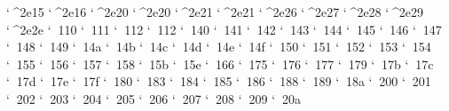 \XeTeXcharclass `^^^^2e15 \symbols
\XeTeXcharclass `^^^^2e16 \symbols
\XeTeXcharclass `^^^^2e20 \symbols
\XeTeXcharclass `^^^^2e20 \symbols
\XeTeXcharclass `^^^^2e21 \symbols
\XeTeXcharclass `^^^^2e21 \symbols
\XeTeXcharclass `^^^^2e26 \symbols
\XeTeXcharclass `^^^^2e27 \symbols
\XeTeXcharclass `^^^^2e28 \symbols
\XeTeXcharclass `^^^^2e29 \symbols
\XeTeXcharclass `^^^^2e2e \symbols
\XeTeXcharclass `^^^^^10110 \symbols
\XeTeXcharclass `^^^^^10111 \symbols
\XeTeXcharclass `^^^^^10112 \symbols
\XeTeXcharclass `^^^^^10112 \symbols
\XeTeXcharclass `^^^^^10140 \symbols
\XeTeXcharclass `^^^^^10141 \symbols
\XeTeXcharclass `^^^^^10142 \symbols
\XeTeXcharclass `^^^^^10143 \symbols
\XeTeXcharclass `^^^^^10144 \symbols
\XeTeXcharclass `^^^^^10145 \symbols
\XeTeXcharclass `^^^^^10146 \symbols
\XeTeXcharclass `^^^^^10147 \symbols
\XeTeXcharclass `^^^^^10148 \symbols
\XeTeXcharclass `^^^^^10149 \symbols
\XeTeXcharclass `^^^^^1014a \symbols
\XeTeXcharclass `^^^^^1014b \symbols
\XeTeXcharclass `^^^^^1014c \symbols
\XeTeXcharclass `^^^^^1014d \symbols
\XeTeXcharclass `^^^^^1014e \symbols
\XeTeXcharclass `^^^^^1014f \symbols
\XeTeXcharclass `^^^^^10150 \symbols
\XeTeXcharclass `^^^^^10151 \symbols
\XeTeXcharclass `^^^^^10152 \symbols
\XeTeXcharclass `^^^^^10153 \symbols
\XeTeXcharclass `^^^^^10154 \symbols
\XeTeXcharclass `^^^^^10155 \symbols
\XeTeXcharclass `^^^^^10156 \symbols
\XeTeXcharclass `^^^^^10157 \symbols
\XeTeXcharclass `^^^^^10158 \symbols
\XeTeXcharclass `^^^^^1015b \symbols
\XeTeXcharclass `^^^^^1015e \symbols
\XeTeXcharclass `^^^^^10166 \symbols
\XeTeXcharclass `^^^^^10175 \symbols
\XeTeXcharclass `^^^^^10176 \symbols
\XeTeXcharclass `^^^^^10177 \symbols
\XeTeXcharclass `^^^^^10179 \symbols
\XeTeXcharclass `^^^^^1017b \symbols
\XeTeXcharclass `^^^^^1017c \symbols
\XeTeXcharclass `^^^^^1017d \symbols
\XeTeXcharclass `^^^^^1017e \symbols
\XeTeXcharclass `^^^^^1017f \symbols
\XeTeXcharclass `^^^^^10180 \symbols
\XeTeXcharclass `^^^^^10183 \symbols
\XeTeXcharclass `^^^^^10184 \symbols
\XeTeXcharclass `^^^^^10185 \symbols
\XeTeXcharclass `^^^^^10186 \symbols
\XeTeXcharclass `^^^^^10188 \symbols
\XeTeXcharclass `^^^^^10189 \symbols
\XeTeXcharclass `^^^^^1018a \symbols
\XeTeXcharclass `^^^^^1d200 \symbols
\XeTeXcharclass `^^^^^1d201 \symbols
\XeTeXcharclass `^^^^^1d202 \symbols
\XeTeXcharclass `^^^^^1d203 \symbols
\XeTeXcharclass `^^^^^1d204 \symbols
\XeTeXcharclass `^^^^^1d205 \symbols
\XeTeXcharclass `^^^^^1d206 \symbols
\XeTeXcharclass `^^^^^1d207 \symbols
\XeTeXcharclass `^^^^^1d208 \symbols
\XeTeXcharclass `^^^^^1d209 \symbols
\XeTeXcharclass `^^^^^1d20a \symbols
